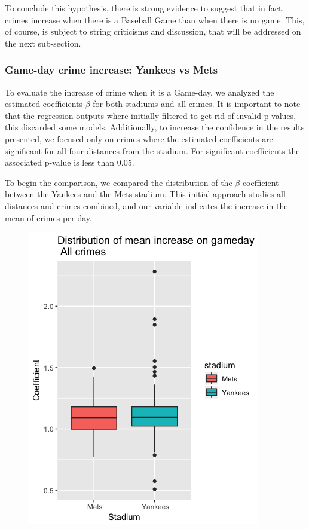 \documentclass{article}
\begin{document}
To conclude this hypothesis, there is strong evidence to suggest that in fact, crimes increase when there is a Baseball Game than when there is no game. This, of course, is subject to string criticisms and discussion, that will be addressed on the next sub-section.   

\subsubsection*{Game-day crime increase: Yankees vs Mets}

To evaluate the increase of crime when it is a Game-day, we analyzed the estimated coefficients $\beta$ for both stadiums and all crimes. It is important to note that the regression outputs where initially filtered to get rid of invalid p-values, this discarded some models. Additionally, to increase the confidence in the results presented, we focused only on crimes where the estimated coefficients are significant for all four distances from the stadium. For significant coefficients the associated p-value is less than 0.05. 

To begin the comparison, we compared the distribution of the $\beta$ coefficient between the Yankees and the Mets stadium. This initial approach studies all distances and crimes combined, and our variable indicates the increase in the mean of crimes per day. 

\begin{figure}[H]
\centering
\includegraphics[scale=0.5]{box_1.png}
\end{figure}
\end{document}
